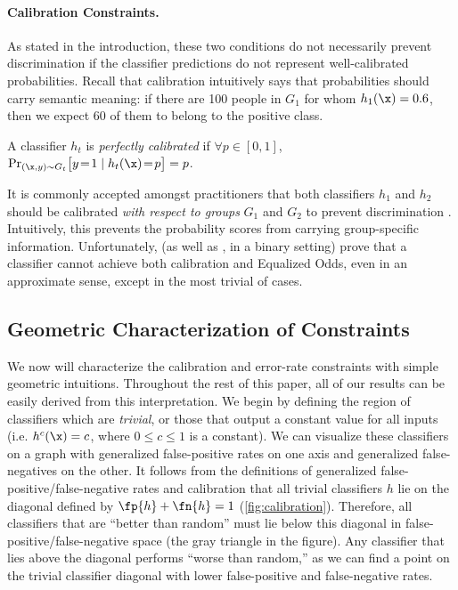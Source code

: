 \paragraph{Calibration Constraints.}
%
As stated in the introduction, these two conditions do not necessarily prevent
discrimination if the classifier predictions do not represent well-calibrated
probabilities.
Recall that calibration intuitively says that
probabilities should carry semantic meaning:
if there are 100 people in $G_1$ for whom
$h_1(\x) = 0.6$, then we expect $60$ of them to belong to the positive class.
%
\begin{definition}
  \label{def:calibration}
  A classifier $h_t$ is \emph{perfectly calibrated} if $\forall p \in [0, 1]$,
  $\Pr_{(\x, y) \sim G_t} \bigl[ y\!=\!1 \mid h_t(\x)\!=\!p \bigr] = p$.
\end{definition}
%
It is commonly accepted amongst practitioners that both classifiers $h_1$ and $h_2$
should be calibrated \emph{with respect to groups} $G_1$ and $G_2$ to prevent
discrimination \cite{berk2017fairness,crowson-calibration-risk-scores,dieterich-northpointe-fairness,flores-re-propublica-fair}.
Intuitively, this prevents the probability scores from carrying group-specific
information.
Unfortunately, \citet{kleinberg2016inherent} (as well as
\cite{chouldechova2017fair}, in a binary setting) prove that
a classifier cannot achieve both calibration and Equalized Odds, even in an approximate
sense, except in the most
trivial of cases.

\subsection{Geometric Characterization of Constraints}

We now will characterize the calibration and error-rate constraints with
simple geometric intuitions. Throughout the rest of this paper, all of our
results can be easily derived from this interpretation.
%
We begin by defining the region of classifiers which are \emph{trivial}, or
those that output a constant value for all inputs (i.e. $h^{c}(\x) = c$,
where $0 \leq c \leq 1$ is a constant).
We can visualize these classifiers on a graph with generalized false-positive
rates on one axis and generalized false-negatives on the other.
It follows from the definitions of generalized false-positive/false-negative
rates and calibration that all trivial classifiers $h$ lie on the diagonal defined by
$\fp{h} + \fn{h} = 1$ (\autoref{fig:calibration}).
Therefore, all classifiers that are ``better than random'' must lie below this
diagonal in false-positive/false-negative space (the gray triangle in the figure).
Any classifier that lies above the diagonal performs
``worse than random,'' as we can find a point on the trivial classifier diagonal
with lower false-positive and false-negative rates.

